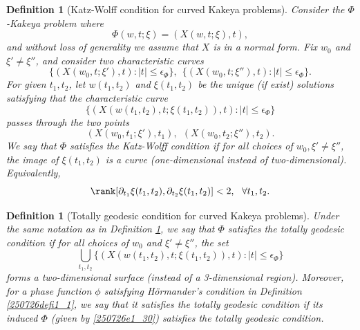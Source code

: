 \documentclass{article}
\numberwithin{equation}{section}
\theoremstyle{plain}
\newtheorem{definition}[theorem]{Definition}
\begin{document}
\begin{definition}[Katz-Wolff condition for curved Kakeya problems]\label{250510defi1_1}
    Consider the $\Phi$-Kakeya problem where
    \begin{equation}
        \Phi(w, t; \xi)= (X(w, t; \xi), t),
    \end{equation}
    and without loss of generality we assume that $X$ is in a normal form. 
    Fix $w_0$ and $\xi'\neq \xi''$, and consider two characteristic curves 
    \begin{equation}
        \{(X(w_0, t; \xi'), t): |t|\le \epsilon_{\Phi}\}, \ \ \{(X(w_0, t; \xi''), t): |t|\le \epsilon_{\Phi}\}.
    \end{equation}
    For given $t_1, t_2$, let $w(t_1, t_2)$ and $\xi(t_1, t_2)$ be the unique (if exist) solutions satisfying that the characteristic curve 
    \begin{equation}
        \{(X(w(t_1, t_2), t; \xi(t_1, t_2)), t): |t|\le \epsilon_{\Phi}\}
    \end{equation}
    passes through the two points
    \begin{equation}
        (X(w_0, t_1; \xi'), t_1), \ \ (X(w_0, t_2; \xi''), t_2).
    \end{equation}
    We say that $\Phi$ satisfies the  Katz-Wolff condition if for all choices of $w_0, \xi'\neq \xi''$, the image of $\xi(t_1,t_2)$ is a curve (one-dimensional instead of two-dimensional). Equivalently, 
\begin{equation}
        \rank[\partial_{t_1} \xi(t_1, t_2), \partial_{t_2} \xi(t_1, t_2)]< 2, \ \ \forall t_1, t_2.
    \end{equation}
\end{definition}













\begin{definition}[Totally geodesic condition for curved Kakeya problems]\label{250801definition1_16}
Under the same notation as in Definition \ref{250510defi1_1}, 
    we say that $\Phi$ satisfies
    the totally geodesic condition if for all choices of  $w_0$ and $\xi'\neq \xi''$, the set 
    \begin{equation}\label{eq: curve surface union}
        \bigcup_{t_1, t_2} \{(X(w(t_1, t_2), t; \xi(t_1, t_2)), t): |t|\le \epsilon_{\Phi}\}
    \end{equation}
    forms a two-dimensional surface (instead of a 3-dimensional region). Moreover, for a phase function $\phi$ satisfying H\"ormander's condition in Definition \ref{250726defi1_1}, we say that it satisfies the totally geodesic condition if its induced $\Phi$ (given by \eqref{250726e1_30}) satisfies the totally geodesic condition. 
\end{definition}
\end{document}
